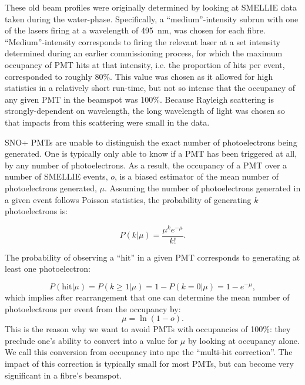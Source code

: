 These old beam profiles were originally determined by looking at SMELLIE data taken during the water-phase. Specifically, a ``medium''-intensity subrun with one of the lasers firing at a wavelength of \SI{495}{\nano\metre}, was chosen for each fibre. ``Medium''-intensity corresponds to firing the relevant laser at a set intensity determined during an earlier commissioning process, for which the maximum occupancy of PMT hits at that intensity, i.e. the proportion of hits per event, corresponded to roughly 80\%. This value was chosen as it allowed for high statistics in a relatively short run-time, but not so intense that the occupancy of any given PMT in the beamspot was 100\%. Because Rayleigh scattering is strongly-dependent on wavelength, the long wavelength of light was chosen so that impacts from this scattering were small in the data.

SNO+ PMTs are unable to distinguish the exact number of photoelectrons being generated. One is typically only able to know if a PMT has been triggered at all, by any number of photoelectrons. As a result, the occupancy of a PMT over a number of SMELLIE events, $o$, is a biased estimator of the mean number of photoelectrons generated, $\mu$. Assuming the number of photoelectrons generated in a given event follows Poisson statistics, the probability of generating $k$ photoelectrons is:

\begin{equation}
    P\left(k | \mu\right) = \frac{\mu^{k}e^{-\mu}}{k!}.
\end{equation}

The probability of observing a ``hit'' in a given PMT corresponds to generating at least one photoelectron:

\begin{equation}\label{eq:p_hit}
    P\left(\text{hit}| \mu\right) = P\left(k\geq 1 | \mu\right) = 1 - P\left(k = 0 | \mu\right) = 1 - e^{-\mu},
\end{equation}
which implies after rearrangement that one can determine the mean number of photoelectrons per event from the occupancy by:
\begin{equation}\label{eq:multihit_correction}
    \mu = \ln\left(1 - o\right).
\end{equation}
This is the reason why we want to avoid PMTs with occupancies of 100\%: they preclude one's ability to convert into a value for $\mu$ by looking at occupancy alone. We call this conversion from occupancy into npe the ``multi-hit correction''. The impact of this correction is typically small for most PMTs, but can become very significant in a fibre's beamspot.

